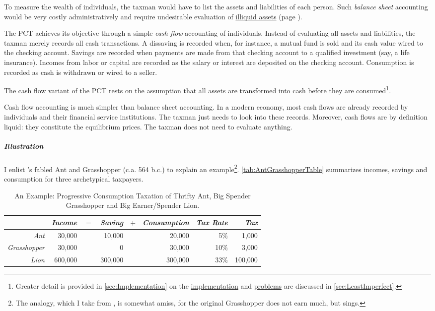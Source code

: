 To measure the wealth of individuals, the taxman would have to list the assets and liabilities of each person. Such \emph{balance sheet} accounting would be very costly administratively and require undesirable evaluation of \hyperref[des:NoIlliquidAssets]{illiquid assets} (page \pageref{des:NoIlliquidAssets}). 

The PCT achieves its objective through a simple \emph{cash flow} accounting of individuals. Instead of evaluating all assets and liabilities, the taxman merely records all cash transactions. A dissaving is recorded when, for instance, a mutual fund is sold and its cash value wired to the checking account. Savings are recorded when payments are made from that checking account to a qualified investment (say, a life insurance). Incomes from labor or capital are recorded as the salary or interest are deposited on the checking account. Consumption is recorded as cash is withdrawn or wired to a seller.

The cash flow variant of the PCT rests on the assumption that all assets are transformed into cash before they are consumed\footnote{Greater detail is provided in \autoref{sec:Implementation} on the \hyperref[sec:Implementation]{implementation} and \hyperref[sec:LeastImperfect]{problems} are discussed in \autoref{sec:LeastImperfect}.}.

Cash flow accounting is much simpler than balance sheet accounting. In a modern economy, most cash flows are already recorded by individuals and their financial service institutions. The taxman just needs to look into these records. Moreover, cash flows are by definition liquid: they constitute the equilibrium prices. The taxman does not need to evaluate anything.

\subparagraph{Illustration} I enlist \citeauthor{Aesop}'s fabled Ant and Grasshopper (c.a. 564 b.c.) to explain an example\footnote{The analogy, which I take from \cite{McCaffery2005}, is somewhat amiss, for the original Grasshopper does not earn much, but sings.}. \autoref{tab:AntGrasshopperTable} summarizes incomes, savings and consumption for three archetypical taxpayers.

\begin{table}
	\caption[Example of a Postpaid Progressive Consumption Tax Account]{An Example: Progressive Consumption Taxation of Thrifty Ant, Big Spender Grasshopper and Big Earner/Spender Lion.}
	\label{tab:AntGrasshopperTable}
	\small
	\begin{center}
	\begin{tabular}{r r r r r r r r}
		\toprule 
					 			&\emph{Income}	&$=$	&\emph{Saving}			&$+$	&\emph{Consumption}		&\emph{Tax Rate}		&\emph{Tax}\\
		\midrule
		\emph{Ant}				&30,000			&		&10,000					&		&20,000					&5\%					&1,000\\
		\emph{Grasshopper}	&30,000			&		&0							&		&30,000					&10\%					&3,000\\						\emph{Lion}			&600,000			&		&300,000					&		&300,000					&33\%					&100,000\\				
		\bottomrule
	\end{tabular}
	\end{center}
\end{table}

